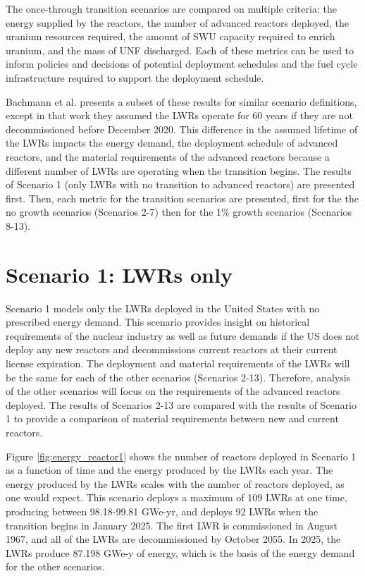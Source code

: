 The once-through transition scenarios are compared on multiple 
criteria: the energy supplied by the reactors, the number of 
advanced reactors deployed, the uranium resources required, the 
amount of \gls{SWU} capacity required to enrich uranium, and the 
mass of \gls{UNF} discharged. Each of these metrics can be used to inform 
policies and decisions of potential deployment schedules and the 
fuel cycle infrastructure required to support the deployment schedule. 

Bachmann et al. \cite{bachmann_enrichment_2021} presents a subset of 
these results for similar scenario definitions, except in that work 
they assumed the 
\glspl{LWR} operate for 60 years if they are not decommissioned before December 
2020. This difference in 
the assumed lifetime of the \glspl{LWR} impacts the energy demand, 
the deployment schedule of advanced reactors, and the material 
requirements of the advanced reactors because a different number of 
\glspl{LWR} are operating when the transition begins. The results of 
Scenario 1 (only \glspl{LWR} with no transition to advanced reactors) 
are presented first. Then, each metric for the transition scenarios are 
presented, first for the the no growth scenarios 
(Scenarios 2-7) then for the 1\% growth scenarios (Scenarios 
8-13).

\section{Scenario 1: LWRs only}\label{sec:scenario1}
Scenario 1 models only the \glspl{LWR} deployed in the United States with no 
prescribed energy demand. This scenario provides insight on historical 
requirements of the nuclear industry as well as future demands if the 
US does not deploy any new reactors and decommissions current reactors at 
their current license expiration. The 
deployment and material requirements of the \glspl{LWR} will be the same 
for each of the other scenarios (Scenarios 2-13). Therefore, analysis 
of the other scenarios will focus on the requirements of 
the advanced reactors deployed. The results of Scenarios 2-13 
are compared with the results of Scenario 1 to provide a comparison 
of material requirements between new and current reactors. 

Figure \ref{fig:energy_reactor1} shows the number of 
reactors deployed in Scenario 1 as a function of time and the energy 
produced by the \glspl{LWR} each year. The energy produced by the 
\glspl{LWR} scales with the number of reactors deployed, as 
one would expect. This scenario deploys a maximum of 109 
\glspl{LWR} at one time, producing 
between 98.18-99.81 GWe-yr, and deploys 92 \glspl{LWR}
when the transition begins in January 2025. The first \gls{LWR} is 
commissioned in August 1967, and all of the \glspl{LWR} are
decommissioned by October 2055. In 2025, the \glspl{LWR} produce 
87.198 GWe-y of energy, which is the basis of the energy demand for 
the other scenarios. 

